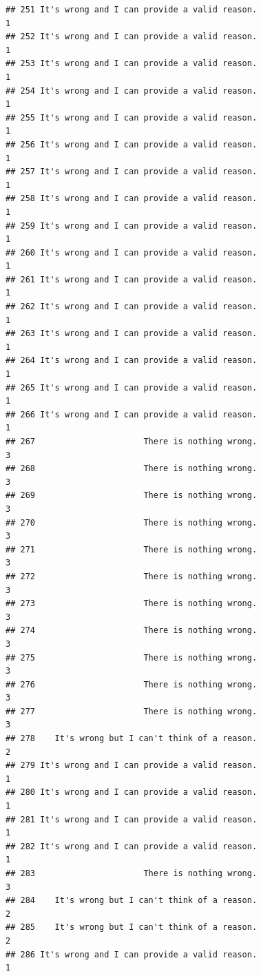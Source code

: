 \documentclass[
  american,
  man,floatsintext]{apa7}
\begin{document}
\begin{verbatim}
## 251 It's wrong and I can provide a valid reason.                    1
## 252 It's wrong and I can provide a valid reason.                    1
## 253 It's wrong and I can provide a valid reason.                    1
## 254 It's wrong and I can provide a valid reason.                    1
## 255 It's wrong and I can provide a valid reason.                    1
## 256 It's wrong and I can provide a valid reason.                    1
## 257 It's wrong and I can provide a valid reason.                    1
## 258 It's wrong and I can provide a valid reason.                    1
## 259 It's wrong and I can provide a valid reason.                    1
## 260 It's wrong and I can provide a valid reason.                    1
## 261 It's wrong and I can provide a valid reason.                    1
## 262 It's wrong and I can provide a valid reason.                    1
## 263 It's wrong and I can provide a valid reason.                    1
## 264 It's wrong and I can provide a valid reason.                    1
## 265 It's wrong and I can provide a valid reason.                    1
## 266 It's wrong and I can provide a valid reason.                    1
## 267                      There is nothing wrong.                    3
## 268                      There is nothing wrong.                    3
## 269                      There is nothing wrong.                    3
## 270                      There is nothing wrong.                    3
## 271                      There is nothing wrong.                    3
## 272                      There is nothing wrong.                    3
## 273                      There is nothing wrong.                    3
## 274                      There is nothing wrong.                    3
## 275                      There is nothing wrong.                    3
## 276                      There is nothing wrong.                    3
## 277                      There is nothing wrong.                    3
## 278    It's wrong but I can't think of a reason.                    2
## 279 It's wrong and I can provide a valid reason.                    1
## 280 It's wrong and I can provide a valid reason.                    1
## 281 It's wrong and I can provide a valid reason.                    1
## 282 It's wrong and I can provide a valid reason.                    1
## 283                      There is nothing wrong.                    3
## 284    It's wrong but I can't think of a reason.                    2
## 285    It's wrong but I can't think of a reason.                    2
## 286 It's wrong and I can provide a valid reason.                    1

\end{verbatim}
\end{document}
